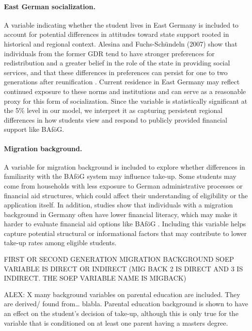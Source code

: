 \paragraph{East German socialization.}  A variable indicating whether the student lives in East Germany is included to account for potential differences in attitudes toward state support rooted in historical and regional context. Alesina and Fuchs-Schündeln (2007) show that individuals from the former GDR tend to have stronger preferences for redistribution and a greater belief in the role of the state in providing social services, and that these differences in preferences can persist for one to two generations after reunification \citep{alesina_good-bye_2007}. Current residence in East Germany may reflect continued exposure to these norms and institutions and can serve as a reasonable proxy for this form of socialization. Since the variable is statistically significant at the 5\% level in our model, we interpret it as capturing persistent regional differences in how students view and respond to publicly provided financial support like BAföG.

\paragraph{Migration background.} A variable for migration background is included to explore whether differences in familiarity with the BAföG system may influence take-up. Some students may come from households with less exposure to German administrative processes or financial aid structures, which could affect their understanding of eligibility or the application itself. In addition, studies show that individuals with a migration background in Germany often have lower financial literacy, which may make it harder to evaluate financial aid options like BAföG \citep{Tsegay_2024}. Including this variable helps capture potential structural or informational factors that may contribute to lower take-up rates among eligible students. 

FIRST OR SECOND GENERATION MIGRATION BACKGROUND SOEP VARIABLE IS DIRECT OR INDIRECT (MIG BACK 2 IS DIRECT AND 3 IS INDIRECT. THE SOEP VARIABLE NAME IS MIGBACK)

ALEX: X many background variables on parental education are included. They are derived/ found from… blabla.
Parental education background is shown to have an effect on the student’s decision of take-up, although this is only true for the variable that is conditioned on at least one parent having a masters degree.

